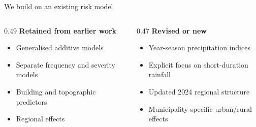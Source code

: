 \begin{frame}{We build on an existing risk model}
  \begin{columns}[T,onlytextwidth]
    \begin{column}{0.49\textwidth}
      \textbf{Retained from earlier work}
      \begin{itemize}
        \item Generalised additive models
        \item Separate frequency and severity models
        \item Building and topographic predictors
        \item Regional effects
      \end{itemize}
    \end{column}
    \begin{column}{0.47\textwidth}
      \textbf{Revised or new}
      \begin{itemize}
        \item Year-season precipitation indices
        \item Explicit focus on short-duration rainfall
        \item Updated 2024 regional structure
        \item Municipality-specific urban/rural effects
      \end{itemize}
    \end{column}
  \end{columns}
\end{frame}

